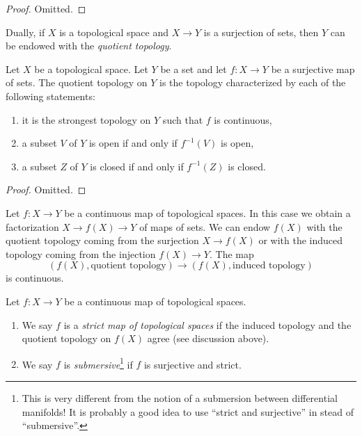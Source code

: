 \begin{proof}
Omitted.
\end{proof}

\noindent
Dually, if $X$ is a topological space and $X \to Y$ is a surjection of
sets, then $Y$ can be endowed with the {\it quotient topology}.

\begin{lemma}
\label{lemma-quotient}
Let $X$ be a topological space. Let $Y$ be a set and let $f : X \to Y$
be a surjective map of sets. The quotient topology on $Y$ is the
topology characterized by each of the following statements:
\begin{enumerate}
\item it is the strongest topology on $Y$ such that $f$ is continuous,
\item a subset $V$ of $Y$ is open if and only if $f^{-1}(V)$ is open,
\item a subset $Z$ of $Y$ is closed if and only if $f^{-1}(Z)$ is closed.
\end{enumerate}
\end{lemma}

\begin{proof}
Omitted.
\end{proof}

\noindent
Let $f : X \to Y$ be a continuous map of topological spaces.
In this case we obtain a factorization $X \to f(X) \to Y$
of maps of sets. We can endow $f(X)$ with the
quotient topology coming from the surjection $X \to f(X)$
or with the induced topology coming from the injection $f(X) \to Y$.
The map
$$
(f(X), \text{quotient topology})
\longrightarrow
(f(X), \text{induced topology})
$$
is continuous.

\begin{definition}
\label{definition-submersive}
Let $f : X \to Y$ be a continuous map of topological spaces.
\begin{enumerate}
\item We say $f$ is a {\it strict map of topological spaces}
if the induced topology and the quotient topology on $f(X)$ agree
(see discussion above).
\item We say $f$ is {\it submersive}\footnote{This is very different from
the notion of a submersion between differential manifolds! It is probably
a good idea to use ``strict and surjective'' in stead of ``submersive''.}
if $f$ is surjective and strict.
\end{enumerate}
\end{definition}

